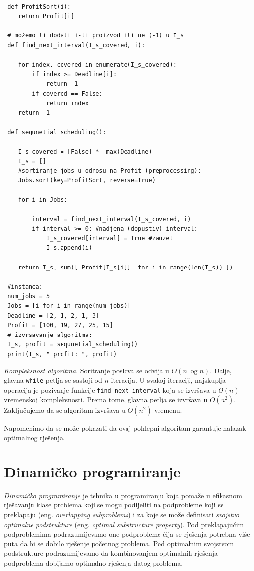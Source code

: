  \begin{verbatim}
 
 def ProfitSort(i):
 	return Profit[i]
 
 # možemo li dodati i-ti proizvod ili ne (-1) u I_s
 def find_next_interval(I_s_covered, i):
 
 	for index, covered in enumerate(I_s_covered):
 		if index >= Deadline[i]:
 			return -1
 		if covered == False:
 			return index
 	return -1        
 
 def sequnetial_scheduling():
 
 	I_s_covered = [False] *  max(Deadline) 
 	I_s = []
 	#sortiranje jobs u odnosu na Profit (preprocessing):
 	Jobs.sort(key=ProfitSort, reverse=True)

 	for i in Jobs:
 
 		interval = find_next_interval(I_s_covered, i)
 		if interval >= 0: #nadjena (dopustiv) interval:
 			I_s_covered[interval] = True #zauzet
 			I_s.append(i)
 
 	return I_s, sum([ Profit[I_s[i]]  for i in range(len(I_s)) ])
 
 #instanca:
 num_jobs = 5
 Jobs = [i for i in range(num_jobs)]
 Deadline = [2, 1, 2, 1, 3]
 Profit = [100, 19, 27, 25, 15]
 # izvrsavanje algoritma:
 I_s, profit = sequnetial_scheduling()
 print(I_s, " profit: ", profit)
 \end{verbatim}

\textit{Kompleksnost algoritma}. Soritranje poslova se odvija u $O(n \log n)$. Dalje, glavna \texttt{while}-petlja se sastoji od $n$ iteracija. U svakoj iteraciji, najskuplja operacija je pozivanje funkcije \texttt{find\_next\_interval} koja se izvršava u $O(n)$ vremenskoj kompleksnosti. Prema tome,   glavna petlja se izvršava u $O(n^2)$. Zaključujemo da se algoritam izvršava u $O(n^2)$ vremenu. 

Napomenimo da se može pokazati da ovaj pohlepni algoritam garantuje nalazak optimalnog rješenja.

\section{Dinamičko programiranje} 

\textit{Dinamičko programiranje} je tehnika u programiranju koja pomaže u efikasnom rješavanju klase problema koji se mogu podijeliti na podprobleme koji se preklapaju (eng. \textit{overlapping subproblems}) i za koje se može definisati \emph{svojstvo optimalne podstrukture} (eng. \textit{optimal substructure property}). Pod preklapajućim podproblemima podrazumijevamo 
one podprobleme čija se rješenja  potrebna više puta da bi se dobilo rješenje početnog problema. Pod optimalnim svojstvom podstrukture   podrazumijevamo da kombinovanjem optimalnih rješenja podproblema dobijamo  optimalno  rješenja datog problema. 

